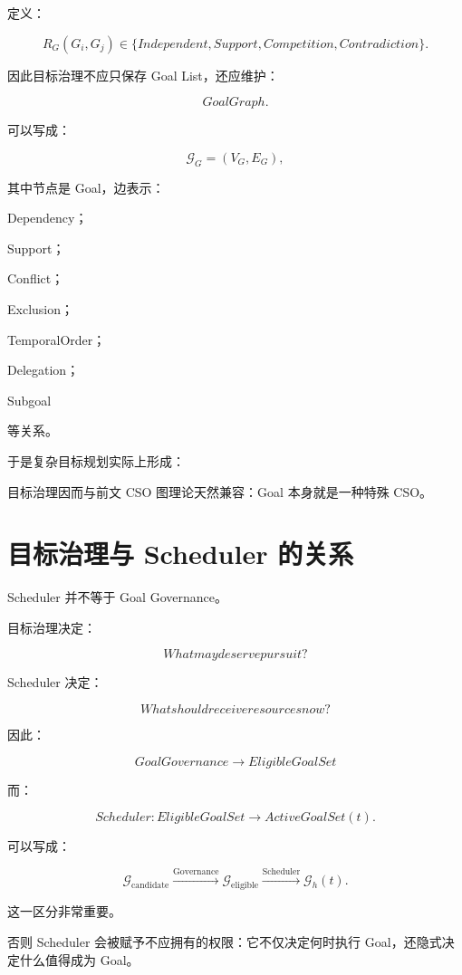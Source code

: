 定义：

\[
R_G(G_i,G_j)
\in
\{
Independent,
Support,
Competition,
Contradiction
\}.
\]

因此目标治理不应只保存 Goal List，还应维护：

\[
\boxed{
GoalGraph.
}
\]

可以写成：

\[
\mathcal G_G
=
(V_G,E_G),
\]

其中节点是 Goal，边表示：

Dependency；

Support；

Conflict；

Exclusion；

TemporalOrder；

Delegation；

Subgoal

等关系。

于是复杂目标规划实际上形成：

\begin{statementbox}
\centering
{}
\end{statementbox}

目标治理因而与前文 CSO 图理论天然兼容：Goal 本身就是一种特殊 CSO。


\section{目标治理与 Scheduler 的关系}

Scheduler 并不等于 Goal Governance。

目标治理决定：

\[
\boxed{
What may deserve pursuit?
}
\]

Scheduler 决定：

\[
\boxed{
What should receive resources now?
}
\]

因此：

\[
GoalGovernance
\rightarrow
EligibleGoalSet
\]

而：

\[
Scheduler
:
EligibleGoalSet
\rightarrow
ActiveGoalSet(t).
\]

可以写成：

\[
\mathcal G_{\mathrm{candidate}}
\xrightarrow{\mathrm{Governance}}
\mathcal G_{\mathrm{eligible}}
\xrightarrow{\mathrm{Scheduler}}
\mathcal G_h(t).
\]

这一区分非常重要。

否则 Scheduler 会被赋予不应拥有的权限：它不仅决定何时执行 Goal，还隐式决定什么值得成为 Goal。


